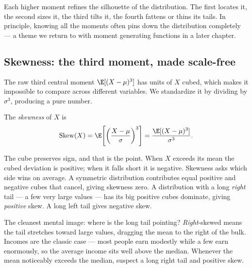 Each higher moment refines the silhouette of the distribution. The first
locates it, the second sizes it, the third tilts it, the fourth fattens or
thins its tails. In principle, knowing all the moments often pins down the
distribution completely --- a theme we return to with moment generating
functions in a later chapter.

\subsection{Skewness: the third moment, made scale-free}

The raw third central moment $\E[(X-\mu)^3]$ has units of $X$ cubed, which
makes it impossible to compare across different variables. We standardize it
by dividing by $\sigma^3$, producing a pure number.

\begin{definition}[Skewness]
\label{ch09:def-skew}
The \emph{skewness} of $X$ is
\[
  \operatorname{Skew}(X) = \E\!\left[\left(\frac{X-\mu}{\sigma}\right)^{3}\right]
  = \frac{\E[(X-\mu)^3]}{\sigma^3}.
\]
\end{definition}

The cube preserves sign, and that is the point. When $X$ exceeds its mean the
cubed deviation is positive; when it falls short it is negative. Skewness asks
which side wins on average. A symmetric distribution contributes equal
positive and negative cubes that cancel, giving skewness zero. A distribution
with a long \emph{right} tail --- a few very large values --- has its big
positive cubes dominate, giving \emph{positive} skew. A long left tail gives
negative skew.

\begin{intuitionbox}
The cleanest mental image: where is the long tail pointing? \emph{Right}-skewed
means the tail stretches toward large values, dragging the mean to the right
of the bulk. Incomes are the classic case --- most people earn modestly while
a few earn enormously, so the average income sits well above the median.
Whenever the mean noticeably exceeds the median, suspect a long right tail and
positive skew.
\end{intuitionbox}

